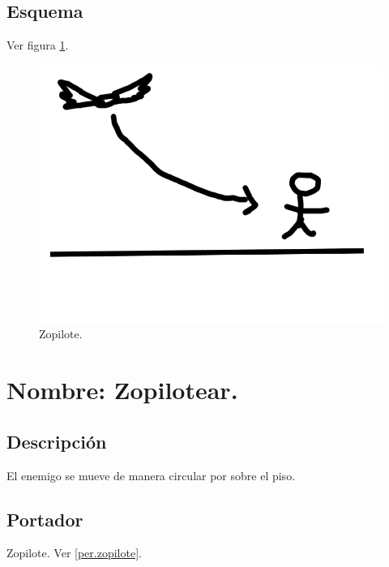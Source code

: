 		\subsection{Esquema}
		Ver figura \ref{fig:rapto}.
		\begin{figure}
			\centering
			\includegraphics[height=0.2 \textheight]{Imagenes/rapto}
			\caption{Zopilote.}
			\label{fig:rapto}
		\end{figure}

	\section{Nombre: Zopilotear.} \label{hab.zopilotear}
		\subsection{Descripción}
		El enemigo se mueve de manera circular por sobre el piso.
		\subsection{Portador}
		Zopilote. Ver \ref{per.zopilote}.
